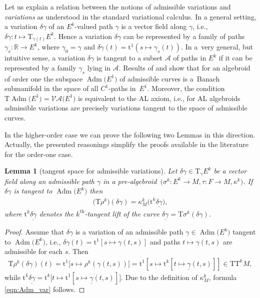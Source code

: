 \documentclass[10pt,a4paper]{amsart}
\newcommand{\thh}[1]{#1^{\mathrm{th}}} %
\newcommand{\R}{\mathbb{R}}
\newcommand{\und}{\underline}
\newcommand{\ra}{\rightarrow}
\newcommand{\prealg}{pre-algebroid} %
\newcommand{\T}{\mathrm{T}} %
\newcommand{\TT}[1]{\mathrm{T}^{#1}} %
\newcommand{\tclass}[2]{\bm{\mathrm{t}}^{#1}#2} %
\newcommand{\Adm}{\operatorname{Adm}} %
\newcommand{\VA}{\mathcal{VA}} %
\numberwithin{equation}{section}
\newtheorem{lem}[thm]{Lemma}
\theoremstyle{definition}
\begin{document}
Let us explain a relation between the notions of admissible variations and \emph{variations} as understood in the standard variational calculus. In a general setting, a variation $\delta \gamma$ of an $E^k$-valued path $\gamma$ is a vector field along $\gamma$, i.e., $\delta\gamma\colon t\mapsto \T_{\gamma(t)} E^k$. Hence a variation $\delta \gamma$ can be represented by a family of paths $\gamma_s\colon \R\ra E^k$, where $\gamma_0 = \gamma$ and $\delta\gamma(t) = \tclass 1{(s\mapsto \gamma_s(t))}$. In a~very general, but intuitive sense, a variation $\delta \gamma$ is tangent to a subset $\mathcal{A}$ of paths in $E^k$ if it can be represented by a family $\gamma_s$ lying in $\mathcal{A}$. Results of \cite{Martinez_2008} and \cite[Theorem~3]{GG_var_calc_gen_alg_2008} show that for an algebroid of order one the subspace $\Adm\big(E^1\big)$
of admissible curves is a~Banach submanifold in the space of all $C^1$-paths in~$E^1$. Moreover, the condition $\T \Adm\big(E^1\big) =\VA\big(E^1\big)$ is equivalent to the AL axiom, i.e., for AL algebroids admissible variations are precisely variations tangent to the space of admissible curves.

 In the higher-order case we can prove the following two Lemmas in this direction. Actually, the presented reasonings simplify the proofs available in the literature for the order-one case.

\begin{lem}[tangent space for admissible variations] \label{lem:adm1} Let $\delta \gamma \in \T_\gamma E^k$ be a vector field along an admissible path $\gamma$ in a \prealg\ $\big(\sigma^k \colon E^k \ra M,\tau\colon F\ra M, \kappa^k\big)$. If $\delta \gamma$ is tangent to $\Adm\big(E^k\big)$ then{\samepage
\begin{gather}\label{eqn:Adm_var}
\big(\T \rho^k\big) (\delta \gamma) = \kappa^k_M\big(\tclass{k}{\und{\delta\gamma}}\big),
\end{gather}
where $\tclass{k}{\und{\delta\gamma}}$ denotes the $\thh{k}$-tangent lift of the curve $\und{\delta\gamma} = \T \sigma^k (\delta \gamma)$.}
\end{lem}
\begin{proof}Assume that $\delta \gamma$ is a variation of an admissible path $\gamma\in\Adm\big(E^k\big)$ tangent to $\Adm\big(E^k\big)$, i.e., $\delta \gamma(t) = \tclass{1}{[s\mapsto \gamma(t,s)]}$ and paths $t\mapsto \gamma(t,s)$ are admissible for each $s$. Then
\begin{gather*}
\T \rho^k (\delta\gamma)(t) = \tclass{1}{\big[s\mapsto \rho^k(\gamma(t, s))\big]} = \tclass{1}{[s\mapsto \tclass{k}{[t\mapsto \und{\gamma}(t, s)]}]} \in \T \TT{k} M,
\end{gather*}
while $ \tclass{k}{\und{\delta \gamma}} = \tclass{k}{\big[t\mapsto\tclass{1}{[s\mapsto \und{\gamma}(t, s)]}\big]}$. Due to the definition of $\kappa^k_M$, formula \eqref{eqn:Adm_var} follows.
\end{proof}
\end{document}
